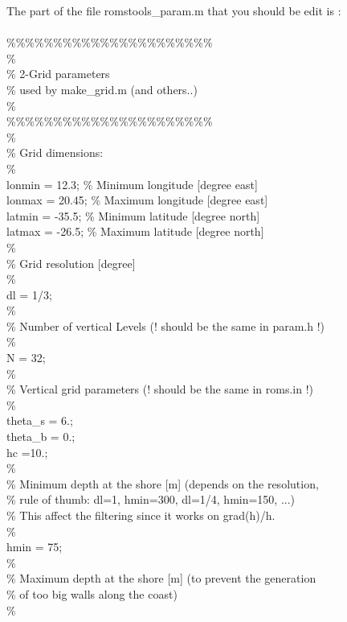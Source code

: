 The part of the file romstools\_param.m that you should be edit is :
\\ \\
\%\%\%\%\%\%\%\%\%\%\%\%\%\%\%\%\%\%\%\%\%\%\\
\%\\
\% 2-Grid parameters\\
\%   used by make\_grid.m (and others..)\\
\%\\
\%\%\%\%\%\%\%\%\%\%\%\%\%\%\%\%\%\%\%\%\%\%\\
\%\\
\% Grid dimensions:\\
\%\\
lonmin =  12.3;   \% Minimum longitude [degree east]\\
lonmax = 20.45;   \% Maximum longitude [degree east]\\
latmin = -35.5;   \% Minimum latitude  [degree north]\\
latmax = -26.5;   \% Maximum latitude  [degree north]\\
\%\\
\% Grid resolution [degree]\\
\%\\
dl = 1/3;\\
\%\\
\% Number of vertical Levels (! should be the same in param.h !)\\
\%\\
N = 32;\\
\%\\
\%  Vertical grid parameters (! should be the same in roms.in !)\\
\%\\
theta\_s = 6.;\\
theta\_b = 0.;\\
hc      =10.;\\
\%\\
\% Minimum depth at the shore [m] (depends on the resolution,\\
\% rule of thumb: dl=1, hmin=300, dl=1/4, hmin=150, ...)\\
\% This affect the filtering since it works on grad(h)/h.\\
\%\\
hmin = 75;\\
\%\\
\% Maximum depth at the shore [m] (to prevent the generation\\
\% of too big walls along the coast)\\
\%\\
